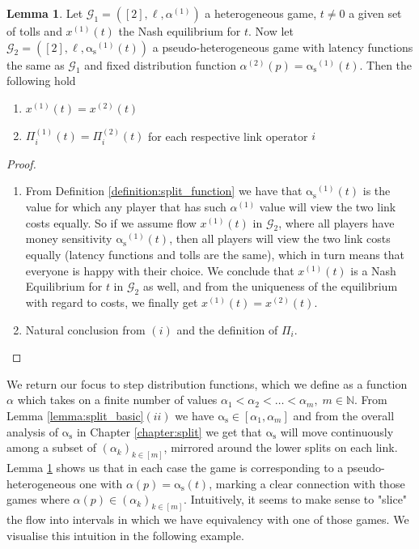 \documentclass[10pt,a4paper]{book}
\newcommand{\as}{\mathrm{\alpha_s}}
\newcommand{\N}{\mathbb{N}}
\newcommand{\Gm}{\mathcal{G}}
\theoremstyle{definition}
\newtheorem{lemma}[definition]{Lemma}
\theoremstyle{comment}
\begin{document}
\begin{lemma}
	\label{lemma:heterogenous_flow_equiv_fixed}
	Let $\Gm_1 = ([2], \ell, \alpha^{(1)})$ a heterogeneous game, $t \ne 0$ a given set of tolls and $x^{(1)}(t)$ the Nash equilibrium for $t$.
	Now let $\Gm_2 = ([2], \ell, \as^{(1)}(t))$ a pseudo-heterogeneous game with latency functions the same as $\Gm_1$ and fixed distribution function $\alpha^{(2)}(p) = \as^{(1)}(t)$.
	Then the following hold
	\begin{enumerate}[$(i)$]
		\item $x^{(1)}(t) = x^{(2)}(t)$
		\item $\Pi_i^{(1)}(t) = \Pi_i^{(2)}(t)$ for each respective link operator $i$
	\end{enumerate}
\end{lemma}

\begin{proof}
	\begin{enumerate}[$(i)$]
		\item From Definition \ref{definition:split_function} we have that $\as^{(1)}(t)$ is the value for which any player that has such $\alpha^{(1)}$ value will view the two link costs equally.
		So if we assume flow $x^{(1)}(t)$ in $\Gm_2$, where all players have money sensitivity $\as^{(1)}(t)$, then all players will view the two link costs equally (latency functions and tolls are the same), which in turn means that everyone is happy with their choice.
		We conclude that $x^{(1)}(t)$ is a Nash Equilibrium for $t$ in $\Gm_2$ as well, and from the uniqueness of the equilibrium with regard to costs, we finally get $x^{(1)}(t) = x^{(2)}(t)$.
		\item Natural conclusion from $(i)$ and the definition of $\Pi_i$.
	\end{enumerate}
\end{proof}

We return our focus to step distribution functions, which we define as a function $\alpha$ which takes on a finite number of values $\alpha_1 < \alpha_2 < \dots < \alpha_m, \; m \in \N$.
From Lemma \ref{lemma:split_basic}$(ii)$ we have $\as \in [\alpha_1, \alpha_m]$ and from the overall analysis of $\as$ in Chapter \ref{chapter:split} we get that $\as$ will move continuously among a subset of $(\alpha_k)_{k \in [m]}$, mirrored around the lower splits on each link.
Lemma \ref{lemma:heterogenous_flow_equiv_fixed} shows us that in each case the game is corresponding to a pseudo-heterogeneous one with $\alpha(p) = \as(t)$, marking a clear connection with those games where $\alpha(p) \in (\alpha_k)_{k \in [m]}$.
Intuitively, it seems to make sense to "slice" the flow into intervals in which we have equivalency with one of those games.
We visualise this intuition in the following example.
\end{document}
